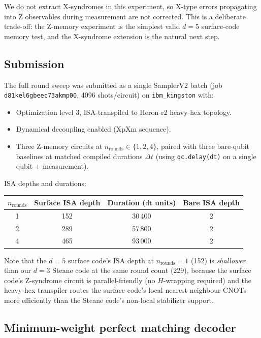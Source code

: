 \documentclass[11pt,letterpaper]{article}
\begin{document}
We do not extract X-syndromes in this experiment, so X-type errors propagating into Z observables during measurement are not corrected. This is a deliberate trade-off: the Z-memory experiment is the simplest valid $d = 5$ surface-code memory test, and the X-syndrome extension is the natural next step.

\subsection{Submission}

The full round sweep was submitted as a single SamplerV2 batch (job \texttt{d81kel6gbeec73akmp00}, 4096 shots/circuit) on \texttt{ibm\_kingston} with:
\begin{itemize}[leftmargin=*,itemsep=0pt]
\item Optimization level 3, ISA-transpiled to Heron-r2 heavy-hex topology.
\item Dynamical decoupling enabled (XpXm sequence).
\item Three Z-memory circuits at $n_{\mathrm{rounds}} \in \{1, 2, 4\}$, paired with three bare-qubit baselines at matched compiled durations $\Delta t$ (using \texttt{qc.delay(dt)} on a single qubit + measurement).
\end{itemize}

ISA depths and durations:
\begin{center}
\begin{tabular}{cccc}
\toprule
$n_{\mathrm{rounds}}$ & Surface ISA depth & Duration ($\mathrm{dt}$ units) & Bare ISA depth \\
\midrule
1 & 152 & 30\,400 & 2 \\
2 & 289 & 57\,800 & 2 \\
4 & 465 & 93\,000 & 2 \\
\bottomrule
\end{tabular}
\end{center}

Note that the $d = 5$ surface code's ISA depth at $n_{\mathrm{rounds}} = 1$ (152) is \emph{shallower} than our $d = 3$ Steane code at the same round count (229), because the surface code's Z-syndrome circuit is parallel-friendly (no $H$-wrapping required) and the heavy-hex transpiler routes the surface code's local nearest-neighbour CNOTs more efficiently than the Steane code's non-local stabilizer support.

\subsection{Minimum-weight perfect matching decoder}
\end{document}
